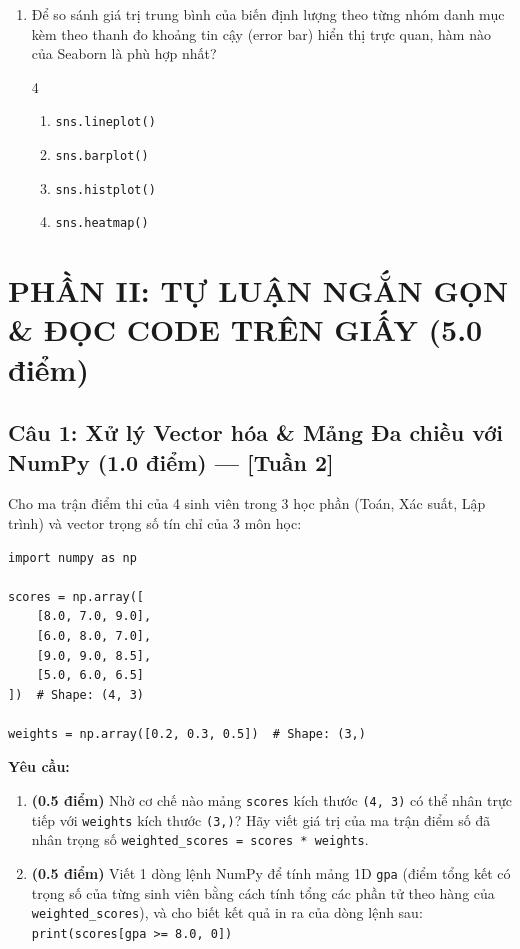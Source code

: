 \documentclass[11pt,a4paper]{article}
\begin{document}
\begin{enumerate}[leftmargin=*,itemsep=2.5pt,resume]
\item Để so sánh giá trị trung bình của biến định lượng theo từng nhóm danh mục kèm theo thanh đo khoảng tin cậy (error bar) hiển thị trực quan, hàm nào của Seaborn là phù hợp nhất?
\begin{multicols}{4}
\begin{enumerate}[label=\Alph*.]
  \item \texttt{sns.lineplot()}
  \item \texttt{sns.barplot()}
  \item \texttt{sns.histplot()}
  \item \texttt{sns.heatmap()}
\end{enumerate}
\end{multicols}

\end{enumerate}

\newpage
\section*{PHẦN II: TỰ LUẬN NGẮN GỌN \& ĐỌC CODE TRÊN GIẤY (5.0 điểm)}

\subsection*{Câu 1: Xử lý Vector hóa \& Mảng Đa chiều với NumPy (1.0 điểm) --- [Tuần 2]}
Cho ma trận điểm thi của 4 sinh viên trong 3 học phần (Toán, Xác suất, Lập trình) và vector trọng số tín chỉ của 3 môn học:
\begin{lstlisting}
import numpy as np

scores = np.array([
    [8.0, 7.0, 9.0],
    [6.0, 8.0, 7.0],
    [9.0, 9.0, 8.5],
    [5.0, 6.0, 6.5]
])  # Shape: (4, 3)

weights = np.array([0.2, 0.3, 0.5])  # Shape: (3,)
\end{lstlisting}

\noindent
\textbf{Yêu cầu:}
\begin{enumerate}[label=\textbf{\alph*)}]
  \item \textbf{(0.5 điểm)} Nhờ cơ chế nào mảng \texttt{scores} kích thước \texttt{(4, 3)} có thể nhân trực tiếp với \texttt{weights} kích thước \texttt{(3,)}? Hãy viết giá trị của ma trận điểm số đã nhân trọng số \texttt{weighted\_scores = scores * weights}.
  \item \textbf{(0.5 điểm)} Viết 1 dòng lệnh NumPy để tính mảng 1D \texttt{gpa} (điểm tổng kết có trọng số của từng sinh viên bằng cách tính tổng các phần tử theo hàng của \texttt{weighted\_scores}), và cho biết kết quả in ra của dòng lệnh sau: \quad \texttt{print(scores[gpa >= 8.0, 0])}
\end{enumerate}
\end{document}
